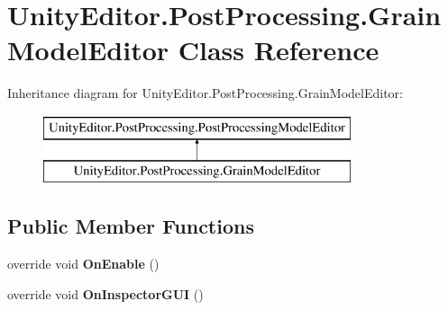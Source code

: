 \hypertarget{class_unity_editor_1_1_post_processing_1_1_grain_model_editor}{}\section{Unity\+Editor.\+Post\+Processing.\+Grain\+Model\+Editor Class Reference}
\label{class_unity_editor_1_1_post_processing_1_1_grain_model_editor}
Inheritance diagram for Unity\+Editor.\+Post\+Processing.\+Grain\+Model\+Editor\+:\begin{figure}[H]
\begin{center}
\leavevmode
\includegraphics[height=2.000000cm]{class_unity_editor_1_1_post_processing_1_1_grain_model_editor}
\end{center}
\end{figure}
\subsection*{Public Member Functions}
\begin{DoxyCompactItemize}
\item 
\mbox{\label{class_unity_editor_1_1_post_processing_1_1_grain_model_editor_aecebb5c4de2fcd7df84dfa52ca8f6e4d}} 
override void {\bfseries On\+Enable} ()
\item 
\mbox{\label{class_unity_editor_1_1_post_processing_1_1_grain_model_editor_a89570fe2538ade6f875dac77284e76c4}} 
override void {\bfseries On\+Inspector\+G\+UI} ()
\end{DoxyCompactItemize}
